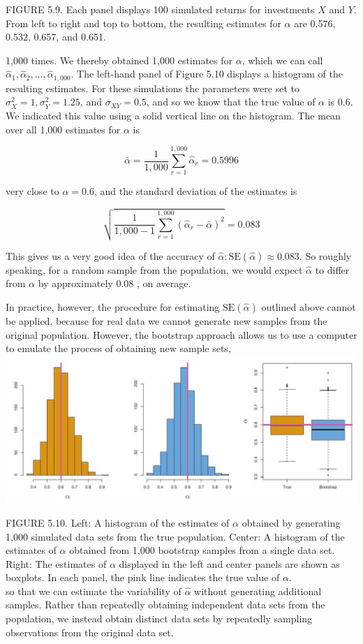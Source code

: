\documentclass[10pt]{article}
\begin{document}
FIGURE 5.9. Each panel displays 100 simulated returns for investments $X$ and $Y$. From left to right and top to bottom, the resulting estimates for $\alpha$ are 0.576, 0.532, 0.657, and 0.651.

1,000 times. We thereby obtained 1,000 estimates for $\alpha$, which we can call $\hat{\alpha}_{1}, \hat{\alpha}_{2}, \ldots, \hat{\alpha}_{1,000}$. The left-hand panel of Figure 5.10 displays a histogram of the resulting estimates. For these simulations the parameters were set to $\sigma_{X}^{2}=1, \sigma_{Y}^{2}=1.25$, and $\sigma_{X Y}=0.5$, and so we know that the true value of $\alpha$ is 0.6. We indicated this value using a solid vertical line on the histogram. The mean over all 1,000 estimates for $\alpha$ is

$$
\bar{\alpha}=\frac{1}{1,000} \sum_{r=1}^{1,000} \hat{\alpha}_{r}=0.5996
$$

very close to $\alpha=0.6$, and the standard deviation of the estimates is

$$
\sqrt{\frac{1}{1,000-1} \sum_{r=1}^{1,000}\left(\hat{\alpha}_{r}-\bar{\alpha}\right)^{2}}=0.083
$$

This gives us a very good idea of the accuracy of $\hat{\alpha}: \mathrm{SE}(\hat{\alpha}) \approx 0.083$. So roughly speaking, for a random sample from the population, we would expect $\hat{\alpha}$ to differ from $\alpha$ by approximately 0.08 , on average.

In practice, however, the procedure for estimating $\mathrm{SE}(\hat{\alpha})$ outlined above cannot be applied, because for real data we cannot generate new samples from the original population. However, the bootstrap approach allows us to use a computer to emulate the process of obtaining new sample sets,\\
\includegraphics[max width=\textwidth, center]{2025_05_05_efe77898333945044de4g-204}

FIGURE 5.10. Left: A histogram of the estimates of $\alpha$ obtained by generating 1,000 simulated data sets from the true population. Center: A histogram of the estimates of $\alpha$ obtained from 1,000 bootstrap samples from a single data set. Right: The estimates of $\alpha$ displayed in the left and center panels are shown as boxplots. In each panel, the pink line indicates the true value of $\alpha$.\\
so that we can estimate the variability of $\hat{\alpha}$ without generating additional samples. Rather than repeatedly obtaining independent data sets from the population, we instead obtain distinct data sets by repeatedly sampling observations from the original data set.
\end{document}
